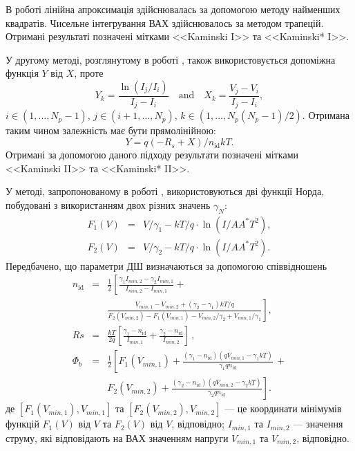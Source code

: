 \documentclass[a4paper,14pt,oneside,openany]{memoir}
\begin{document}
В роботі лінійна апроксимація здійснювалась за допомогою методу найменших квадратів.
Чисельне інтегрування ВАХ здійснювалось за методом трапецій.
Отримані результаті позначені мітками <<Kaminski I>> та <<Kaminski* I>>.

У другому методі, розглянутому в роботі \cite{Kaminski}, також використовується допоміжна функція $Y$ від $X$, проте
\begin{equation}
\label{eqKam2}
Y_k=\frac{\ln(I_j/I_i)}{I_j-I_i} \quad\text{and}\quad X_k=\frac{V_j-V_i}{I_j-I_i},
\end{equation}
$i\in(1,\ldots, N_p-1)$,
$j\in(i+1,\ldots, N_p)$,
$k\in(1,\ldots, N_p(N_p-1)/2)$.
Отримана таким чином залежність має бути прямолінійною:
\begin{equation}
\label{eqKam2Det}
Y=q(-R_s+X)/n_\mathrm{id}kT.
\end{equation}
Отримані за допомогою даного підходу результати позначені мітками <<Kaminski II>> та <<Kaminski* II>>.

У методі, запропонованому в роботі \cite{Bohlin}, використовуються дві функції Норда, побудовані з використанням двох різних значень $\gamma_N$:
\begin{eqnarray}
\label{eqBohlin}
F_1(V)&=&V/\gamma_1-kT/q\cdot\ln(I/AA^*T^2),
\nonumber\\
F_2(V)&=&V/\gamma_2-kT/q\cdot\ln(I/AA^*T^2).
\end{eqnarray}
Передбачено, що параметри ДШ визначаються за допомогою співвідношень
\begin{eqnarray}
\label{eqBohlinDet}
n_\mathrm{id}&=&\frac{1}{2}\left[\frac{\gamma_1I_{min,2}-\gamma_2I_{min,1}}{I_{min,2}-I_{min,1}}+\right.
\\
&&\left.\frac{V_{min,1}-V_{min,2}+(\gamma_2-\gamma_1)kT/q}{F_2(V_{min,2})-F_1(V_{min,1})-V_{min,2}/\gamma_2+V_{min,1}/\gamma_1}\right]
,\nonumber
\\
Rs&=&\frac{kT}{2q}\left[\frac{\gamma_1-n_\mathrm{id}}{I_{min,1}}+\frac{\gamma_2-n_\mathrm{id}}{I_{min,2}}\right]\,,
\\
\Phi_b&=&\frac{1}{2}\left[F_1(V_{min,1})+\frac{(\gamma_1-n_\mathrm{id})(qV_{min,1}-\gamma_1kT)}{\gamma_1qn_\mathrm{id}}\,+\right.
\nonumber\\
&&\left.F_2(V_{min,2})+\frac{(\gamma_2-n_\mathrm{id})(qV_{min,2}-\gamma_2kT)}{\gamma_2qn_\mathrm{id}}\right].
\end{eqnarray}
де
$[F_1(V_{min,1}), V_{min,1}]$ та $[F_2(V_{min,2}), V_{min,2}]$ --- це координати мінімумів функцій  $F_1(V)$ від $V$ та $F_2(V)$ від $V$, відповідно;
$I_{min,1}$ та $I_{min,2}$ --- значення струму, які відповідають на ВАХ значенням напруги $V_{min,1}$ та $V_{min,2}$, відповідно.
\end{document}
